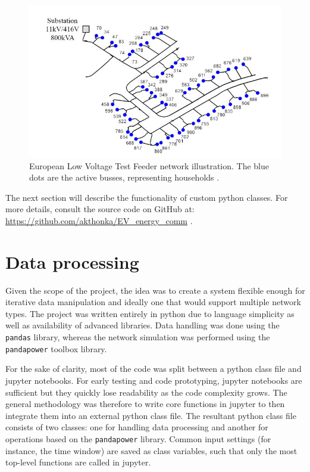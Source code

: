 \documentclass[a4paper,10pt]{report}
\begin{document}
\begin{figure}[htpb]
	\centering
	\includegraphics[width=0.6\linewidth]{EU_LV_test_feeder}
	\caption[European Low-Voltage Test Feeder layout]{European Low Voltage Test Feeder network illustration. The blue dots are the active busses, representing households \cite{Nousdilis2017}.}
	\label{EU_LV_test_feeder}
\end{figure}

The next section will describe the functionality of custom python classes. For more details, consult the source code on GitHub at: \url{https://github.com/akthonka/EV_energy_comm} .

\newpage
\section{Data processing}\label{section_data_processing}
Given the scope of the project, the idea was to create a system flexible enough for iterative data manipulation and ideally one that would support multiple network types. The project was written entirely in python due to language simplicity as well as availability of advanced libraries. Data handling was done using the \texttt{pandas} library, whereas the network simulation was performed using the \texttt{pandapower} toolbox library.

For the sake of clarity, most of the code was split between a python class file and jupyter notebooks. For early testing and code prototyping, jupyter notebooks are sufficient but they quickly lose readability as the code complexity grows. The general methodology was therefore to write core functions in jupyter to then integrate them into an external python class file. The resultant python class file consists of two classes: one for handling data processing and another for operations based on the \texttt{pandapower} library. Common input settings (for instance, the time window) are saved as class variables, such that only the most top-level functions are called in jupyter.
\end{document}
